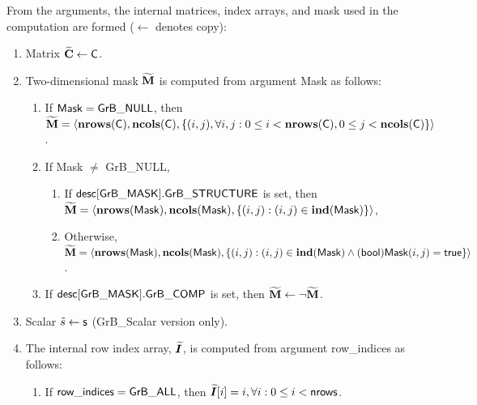 From the arguments, the internal matrices, index arrays, and mask used in 
the computation are formed ($\leftarrow$ denotes copy):
\begin{enumerate}
	\item Matrix ${\bf \widetilde{C}} \leftarrow {\sf C}$.

	\item Two-dimensional mask ${\bf \widetilde{M}}$ is computed from
    argument {\sf Mask} as follows:
	\begin{enumerate}
		\item If ${\sf Mask} = {\sf GrB\_NULL}$, then ${\bf \widetilde{M}} = 
        \langle \bold{nrows}({\sf C}), \bold{ncols}({\sf C}), \{(i,j), 
        \forall i,j : 0 \leq i <  \bold{nrows}({\sf C}), 0 \leq j < 
        \bold{ncols}({\sf C}) \} \rangle$.

		\item If {\sf Mask} $\ne$ {\sf GrB\_NULL},
        \begin{enumerate}
            \item If ${\sf desc[GrB\_MASK].GrB\_STRUCTURE}$ is set, then 
            ${\bf \widetilde{M}} = \langle \bold{nrows}({\sf Mask}), 
            \bold{ncols}({\sf Mask}), \{(i,j) : (i,j) \in \bold{ind}({\sf Mask}) \} \rangle$,
            \item Otherwise, ${\bf \widetilde{M}} = \langle \bold{nrows}({\sf Mask}), 
            \bold{ncols}({\sf Mask}), \\ \{(i,j) : (i,j) \in \bold{ind}({\sf Mask}) \wedge 
            ({\sf bool}){\sf Mask}(i,j) = {\sf true}\} \rangle$.
        \end{enumerate}

		\item	If ${\sf desc[GrB\_MASK].GrB\_COMP}$ is set, then 
        ${\bf \widetilde{M}} \leftarrow \neg {\bf \widetilde{M}}$.
	\end{enumerate}

    \item Scalar ${\tilde{s}} \leftarrow {\sf s}$ ({\sf GrB\_Scalar} version only).

    \item The internal row index array, $\bm{\widetilde{I}}$, is computed from 
    argument {\sf row\_indices} as follows:
	\begin{enumerate}
		\item	If ${\sf row\_indices} = {\sf GrB\_ALL}$, then 
        $\bm{\widetilde{I}}[i] = i, \forall i : 0 \leq i < {\sf nrows}$.


\end{enumerate}
\end{enumerate}

